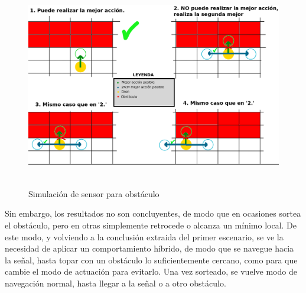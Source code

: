 \begin{figure} [t]
    \begin{center}
    \includegraphics[height=9cm]{imagenes/cap4/28_pseudosensor.png}
    \end{center}
    \caption[Simulación de sensor para obstáculo]{Simulación de sensor para obstáculo}
    \label{fig:pseudosensor}
\end{figure}

Sin embargo, los resultados no son concluyentes, de modo que en ocasiones sortea el obstáculo, pero en otras simplemente retrocede o alcanza un mínimo local. De este modo, y volviendo a la conclusión extraida del primer escenario, se ve la necesidad de aplicar un comportamiento híbrido, de modo que se navegue hacia la señal, hasta topar con un obstáculo lo suficientemente cercano, como para que cambie el modo de actuación para evitarlo. Una vez sorteado, se vuelve modo de navegación normal, hasta llegar a la señal o a otro obstáculo.\\

